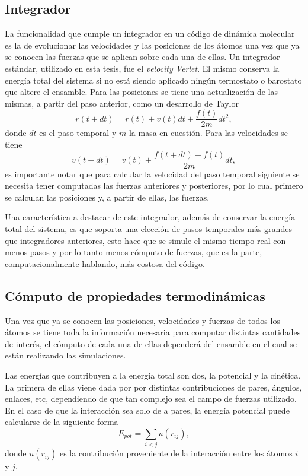 \subsection{Integrador}

La funcionalidad que cumple un integrador en un código de dinámica molecular es
la de evolucionar las velocidades y las posiciones de los átomos una vez que 
ya se conocen las fuerzas que se aplican sobre cada una de ellas. Un integrador
estándar, utilizado en esta tesis, fue el \textit{velocity Verlet}. El mismo 
conserva la energía total del sistema si no está siendo aplicado ningún termostato
o barostato que altere el ensamble. Para las posiciones se tiene una
actualización de las mismas, a partir del paso anterior, como un desarrollo de
Taylor
$$
r(t+dt) = r(t) + v(t) dt + \frac{f(t)}{2m} dt^2,
$$
donde $dt$ es el paso temporal y $m$ la masa en cuestión. Para las velocidades se
tiene
$$
v(t+dt) = v(t) + \frac{f(t+dt)+f(t)}{2m} dt,
$$
es importante notar que para calcular la velocidad del paso temporal siguiente se
necesita tener computadas las fuerzas anteriores y posteriores, por lo cual
primero se calculan las posiciones y, a partir de ellas, las fuerzas.

Una característica a destacar de este integrador, además de conservar la energía
total del sistema, es que soporta una elección de pasos temporales más grandes
que integradores anteriores, esto hace que se simule el mismo tiempo real con 
menos pasos y por lo tanto menos cómputo de fuerzas, que es la parte, 
computacionalmente hablando, más costosa del código.

\subsection{Cómputo de propiedades termodinámicas}

Una vez que ya se conocen las posiciones, velocidades y fuerzas de todos los 
átomos se tiene toda la información necesaria para computar distintas
cantidades de interés, el cómputo de cada una de ellas dependerá del ensamble en
el cual se están realizando las simulaciones.

Las energías que contribuyen a la energía total son dos, la potencial y la
cinética. La primera de ellas viene dada por por distintas contribuciones de
pares, ángulos, enlaces, etc, dependiendo de que tan complejo sea el campo de 
fuerzas utilizado. En el caso de que la interacción sea solo de a pares, la
energía potencial puede calcularse de la siguiente forma
$$
E_{pot} = \sum_{i < j} u(r_{ij}),
$$
donde $u(r_{ij})$ es la contribución proveniente de la interacción entre los 
átomos $i$ y $j$.

